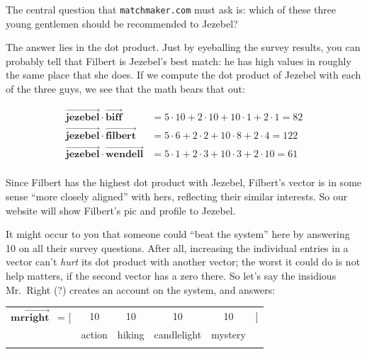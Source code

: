 The central question that \texttt{matchmaker.com} must ask is: which of these
three young gentlemen should be recommended to Jezebel?

\smallskip

The answer lies in the dot product. Just by eyeballing the survey results, you
can probably tell that Filbert is Jezebel's best match: he has high values in
roughly the same place that she does. If we compute the dot product of Jezebel
with each of the three guys, we see that the math bears that out:

\begin{align*}
\overrightarrow{\textbf{jezebel}} \cdot \overrightarrow{\textbf{biff}} &=
5 \cdot 10 + 2 \cdot 10 + 10 \cdot 1 + 2 \cdot 1 = 82 \\
\overrightarrow{\textbf{jezebel}} \cdot \overrightarrow{\textbf{filbert}} &=
5 \cdot 6 + 2 \cdot 2 + 10 \cdot 8 + 2 \cdot 4 = 122 \\
\overrightarrow{\textbf{jezebel}} \cdot \overrightarrow{\textbf{wendell}} &=
5 \cdot 1 + 2 \cdot 3 + 10 \cdot 3 + 2 \cdot 10 = 61 \\
\end{align*}

Since Filbert has the highest dot product with Jezebel, Filbert's vector is in
some sense ``more closely aligned'' with hers, reflecting their similar
interests. So our website will show Filbert's pic and profile to Jezebel.

\medskip


It might occur to you that someone could ``beat the system'' here by answering
10 on all their survey questions. After all, increasing the individual entries
in a vector can't \textit{hurt} its dot product with another vector; the worst
it could do is not help matters, if the second vector has a zero there. So
let's say the insidious Mr.~Right (?) creates an account on the system, and
answers:

\begin{center}
\begin{tabular}{cccccc}
$\overrightarrow{\textbf{mrright}}$ \quad \ = [ & 10 & 10 & 10 & 10 & ] \\
& \scriptsize{action} & \scriptsize{hiking} & \scriptsize{candlelight} &
\scriptsize{mystery} & \medskip \\
\normalsize
\end{tabular}
\end{center}
\vspace{-.15in}


